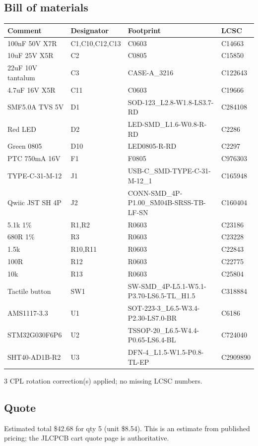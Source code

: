 \documentclass[11pt,a4paper]{article}
\begin{document}
\subsection*{Bill of materials}
{\small
\begin{longtable}{p{4.4cm}p{2.8cm}p{4.6cm}l}
\toprule
\textbf{Comment} & \textbf{Designator} & \textbf{Footprint} & \textbf{LCSC} \\
\midrule
\endhead
100nF 50V X7R & C1,C10,C12,C13 & C0603 & C14663 \\
10uF 25V X5R & C2 & C0805 & C15850 \\
22uF 10V tantalum & C3 & CASE-A\_3216 & C122643 \\
4.7uF 16V X5R & C11 & C0603 & C19666 \\
SMF5.0A TVS 5V & D1 & SOD-123\_L2.8-W1.8-LS3.7-RD & C284108 \\
Red LED & D2 & LED-SMD\_L1.6-W0.8-R-RD & C2286 \\
Green 0805 & D10 & LED0805-R-RD & C2297 \\
PTC 750mA 16V & F1 & F0805 & C976303 \\
TYPE-C-31-M-12 & J1 & USB-C\_SMD-TYPE-C-31-M-12\_1 & C165948 \\
Qwiic JST SH 4P & J2 & CONN-SMD\_4P-P1.00\_SM04B-SRSS-TB-LF-SN & C160404 \\
5.1k 1\% & R1,R2 & R0603 & C23186 \\
680R 1\% & R3 & R0603 & C23228 \\
1.5k & R10,R11 & R0603 & C22843 \\
100R & R12 & R0603 & C22775 \\
10k & R13 & R0603 & C25804 \\
Tactile button & SW1 & SW-SMD\_4P-L5.1-W5.1-P3.70-LS6.5-TL\_H1.5 & C318884 \\
AMS1117-3.3 & U1 & SOT-223-3\_L6.5-W3.4-P2.30-LS7.0-BR & C6186 \\
STM32G030F6P6 & U2 & TSSOP-20\_L6.5-W4.4-P0.65-LS6.4-BL & C724040 \\
SHT40-AD1B-R2 & U3 & DFN-4\_L1.5-W1.5-P0.8-TL-EP & C2909890 \\
\bottomrule
\end{longtable}
}
3 CPL rotation correction(s) applied; no missing LCSC numbers.
\subsection*{Quote}
Estimated total \$42.68 for qty 5 (unit \$8.54). This is an estimate from published pricing; the JLCPCB cart quote page is authoritative.
\end{document}
